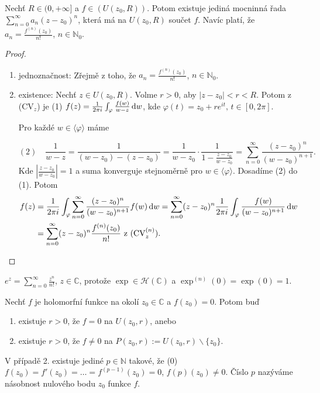 \begin{theorem}
Nechť $R \in (0, +\infty]$ a $f \in (U(z_0,R))$. Potom existuje jediná mocninná řada $\sum\limits _{n=0} ^{\infty} a_n(z-z_0)^n$, která má na $U(z_0,R)$ součet $f$. Navíc platí, že $a_n=\frac{f^{(n)}(z_0)}{n!}$, $n \in \mathbb{N}_0$.
\end{theorem}

\begin{proof}
\begin{enumerate}
    \item jednoznačnost: Zřejmě z toho, že $a_n=\frac{f^{(n)}(z_0)}{n!}$, $n \in \mathbb{N}_0$.
    \item existence: Nechť $z \in U(z_0, R)$. Volme $r>0$, aby $|z-z_0|<r<R$. Potom z (CV$_z$) je (1) $f(z)=\frac{1}{2 \pi i} \int_\varphi \frac{f(w)}{w-z} \mathop{}\!\mathrm{d} w$, kde $\varphi(t)=z_0+re^{it} \text{, } t \in [0, 2\pi]$.
    
    Pro každé $w \in \langle \varphi \rangle$ máme
    
    $$(2) \quad \frac{1}{w-z}=\frac{1}{(w-z_0)-(z-z_0)}=\frac{1}{w-z_0}\cdot\frac{1}{1-\frac{z-z_0}{w-z_0}}=\sum_{n=0}^\infty \frac{(z-z_0)^n}{(w-z_0)^{n+1}} \text{.}$$
    Kde $|\frac{z-z_0}{w-z_0}|=1$ a suma konverguje stejnoměrně pro $w \in  \langle \varphi \rangle$. Dosadíme (2) do (1). Potom
    \begin{equation*}
        \begin{split}
    f(z) &=\frac{1}{2 \pi i} \int_\varphi \sum_{n=0}^\infty \frac{(z-z_0)^n}{(w-z_0)^{n+1}} f(w) \mathop{}\!\mathrm{d} w= 
    \sum_{n=0}^\infty (z-z_0)^n \frac{1}{2 \pi i} \int_\varphi \frac{f(w)}{(w-z_0)^{n+1}} \mathop{}\!\mathrm{d} w \\
     &=\sum_{n=0}^\infty (z-z_0)^n \frac{f^{(n)}(z_0)}{n!} \text{ z (CV}_z^{(n)} \text{).}
     \end{split}
    \end{equation*}
\end{enumerate}
\end{proof}

\begin{example}
$e^z=\sum\limits_{n=0}^\infty \frac{z^n}{n!}$, $z \in \mathbb{C}$, protože $\exp \in \mathcal{H}(\mathbb{C})$ a $\exp^{(n)}(0)=\exp(0)=1$.
\end{example}

\begin{theorem}
Nechť $f$ je holomorfní funkce na okolí $z_0 \in \mathbb{C}$ a $f(z_0)=0$. Potom buď
\begin{enumerate}
    \item existuje $r>0$, že $f=0$ na $U(z_0,r)$, anebo
    \item existuje $r>0$, že $f\neq 0$ na $P(z_0,r):=U(z_0,r)\backslash \{z_0\}$.
\end{enumerate}
V případě 2. existuje jediné $p\in \mathbb{N}$ takové, že (0) $f(z_0)=f'(z_0)= \ldots = f^{(p-1)}(z_0)=0$, $f{(p)}(z_0) \neq 0$. Číslo $p$ nazýváme násobnost nulového bodu $z_0$ funkce $f$.
\end{theorem}

